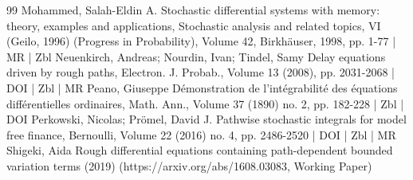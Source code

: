 \documentclass[10pt]{amsart}
\theoremstyle{definition}\newtheorem{defi}[theo]{Definition}\newtheorem{rema}[theo]{Remark}\newtheorem{exam}[theo]{Example}\newtheorem{exem}[theo]{Example}\newtheorem{nota}[theo]{Notation}
\begin{document}
\begin{thebibliography}{99}
Mohammed, Salah-Eldin A. Stochastic differential systems with memory: theory, examples and applications, Stochastic analysis and related topics, VI (Geilo, 1996) (Progress in Probability), Volume 42, Birkhäuser, 1998, pp. 1-77 | MR | Zbl
Neuenkirch, Andreas; Nourdin, Ivan; Tindel, Samy Delay equations driven by rough paths, Electron. J. Probab., Volume 13 (2008), pp. 2031-2068 | DOI | Zbl | MR
Peano, Giuseppe Démonstration de l’intégrabilité des équations différentielles ordinaires, Math. Ann., Volume 37 (1890) no. 2, pp. 182-228 | Zbl | DOI
Perkowski, Nicolas; Prömel, David J. Pathwise stochastic integrals for model free finance, Bernoulli, Volume 22 (2016) no. 4, pp. 2486-2520 | DOI | Zbl | MR
Shigeki, Aida Rough differential equations containing path-dependent bounded variation terms (2019) (https://arxiv.org/abs/1608.03083, Working Paper)
\end{thebibliography}
\end{document}

